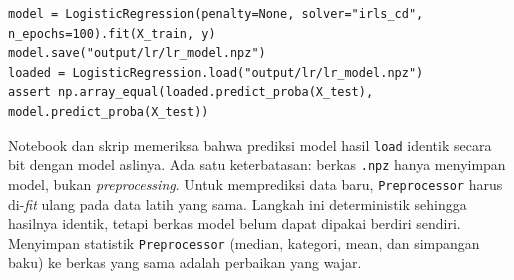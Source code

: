 \begin{lstlisting}[caption={Contoh penyimpanan dan pemuatan model},label={lst:lr-saveload}]
model = LogisticRegression(penalty=None, solver="irls_cd", n_epochs=100).fit(X_train, y)
model.save("output/lr/lr_model.npz")
loaded = LogisticRegression.load("output/lr/lr_model.npz")
assert np.array_equal(loaded.predict_proba(X_test), model.predict_proba(X_test))
\end{lstlisting}

Notebook dan skrip memeriksa bahwa prediksi model hasil \texttt{load} identik secara bit dengan model aslinya. Ada satu keterbatasan: berkas \texttt{.npz} hanya menyimpan model, bukan \textit{preprocessing}. Untuk memprediksi data baru, \texttt{Preprocessor} harus di-\textit{fit} ulang pada data latih yang sama. Langkah ini deterministik sehingga hasilnya identik, tetapi berkas model belum dapat dipakai berdiri sendiri. Menyimpan statistik \texttt{Preprocessor} (median, kategori, mean, dan simpangan baku) ke berkas yang sama adalah perbaikan yang wajar.
